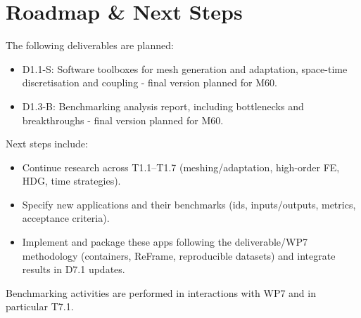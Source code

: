 \section{Roadmap \& Next Steps}

The following deliverables are planned:
\begin{itemize}
    \item D1.1-S: Software toolboxes for mesh generation and adaptation, space-time discretisation and coupling - final version planned for M60.
    \item D1.3-B: Benchmarking analysis report, including bottlenecks and breakthroughs - final version planned for M60.
\end{itemize}
Next steps include:
\begin{itemize}
    \item Continue research across T1.1--T1.7 (meshing/adaptation, high-order FE, HDG, time strategies).
    \item Specify new applications and their benchmarks (ids, inputs/outputs, metrics, acceptance criteria).
    \item Implement and package these apps following the deliverable/WP7 methodology (containers, ReFrame, reproducible datasets) and integrate results in D7.1 updates.
\end{itemize}
Benchmarking activities are performed in interactions with WP7 and in particular T7.1.

